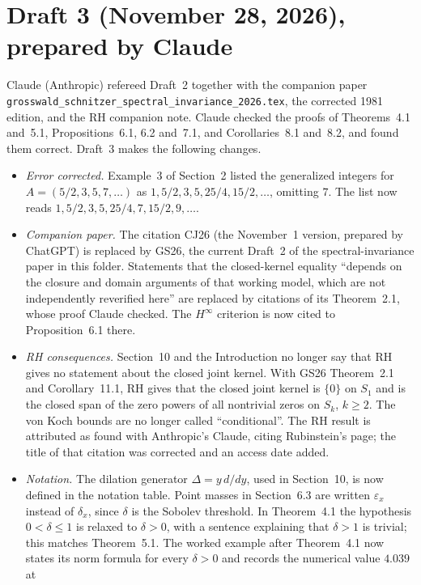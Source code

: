 \documentclass[12pt,letterpaper]{article}
\begin{document}
\section{Draft 3 (November 28, 2026), prepared by Claude}
Claude (Anthropic) refereed Draft~2 together with the companion paper
\nolinkurl{grosswald_schnitzer_spectral_invariance_2026.tex}, the
corrected 1981 edition, and the RH companion note.  Claude checked the
proofs of Theorems~4.1 and~5.1, Propositions~6.1, 6.2 and~7.1, and
Corollaries~8.1 and~8.2, and found them correct.  Draft~3 makes the
following changes.
\begin{itemize}
\item \emph{Error corrected.}  Example~3 of Section~2 listed the
  generalized integers for $A=(5/2,3,5,7,\ldots)$ as
  $1,5/2,3,5,25/4,15/2,\ldots$, omitting $7$.  The list now reads
  $1,5/2,3,5,25/4,7,15/2,9,\ldots$.
\item \emph{Companion paper.}  The citation CJ26 (the November~1 version,
  prepared by ChatGPT) is replaced by GS26, the current Draft~2 of the
  spectral-invariance paper in this folder.  Statements that the
  closed-kernel equality ``depends on the closure and domain arguments of
  that working model, which are not independently reverified here'' are
  replaced by citations of its Theorem~2.1, whose proof Claude checked.
  The $H^\infty$ criterion is now cited to Proposition~6.1 there.
\item \emph{RH consequences.}  Section~10 and the Introduction no longer
  say that RH gives no statement about the closed joint kernel.  With
  GS26 Theorem~2.1 and Corollary~11.1, RH gives that the closed joint
  kernel is $\{0\}$ on $S_1$ and is the closed span of the zero powers
  of all nontrivial zeros on $S_k$, $k\ge2$.  The von Koch bounds are no
  longer called ``conditional''.  The RH result is attributed as found
  with Anthropic's Claude, citing Rubinstein's page; the title of that
  citation was corrected and an access date added.
\item \emph{Notation.}  The dilation generator $\Delta=y\,d/dy$, used in
  Section~10, is now defined in the notation table.  Point masses in
  Section~6.3 are written $\varepsilon_x$ instead of $\delta_x$, since
  $\delta$ is the Sobolev threshold.  In Theorem~4.1 the hypothesis
  $0<\delta\le1$ is relaxed to $\delta>0$, with a sentence explaining
  that $\delta>1$ is trivial; this matches Theorem~5.1.  The worked
  example after Theorem~4.1 now states its norm formula for every
  $\delta>0$ and records the numerical value $4.039$ at

\end{itemize}
\end{document}
